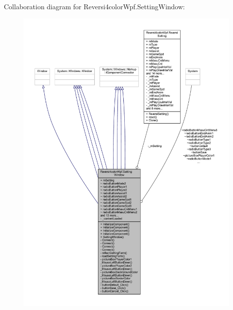Collaboration diagram for Reversi4color\+Wpf.\+Setting\+Window\+:
\nopagebreak
\begin{figure}[H]
\begin{center}
\leavevmode
\includegraphics[width=350pt]{class_reversi4color_wpf_1_1_setting_window__coll__graph}
\end{center}
\end{figure}

